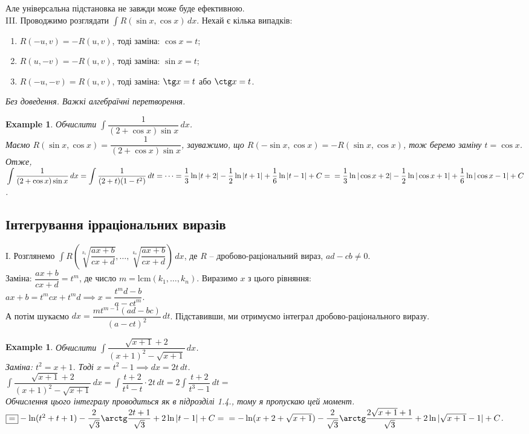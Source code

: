 \documentclass[a4paper, 10pt]{article}
\def\huge{\displaystyle}
\theoremstyle{theoremdd}
\theoremstyle{theoremdd}
\theoremstyle{theoremdd}
\theoremstyle{theoremdd}
\theoremstyle{theoremdd}
\newtheorem{example}[theorem]{Example}
\theoremstyle{theoremdd}
\theoremstyle{theoremdd}
\theoremstyle{theoremdd}
\theoremstyle{theoremdd}
\begin{document}
Але універсальна підстановка не завжди може буде ефективною.
\bigskip \\
III. Проводжимо розглядати $\huge\int R(\sin x, \cos x) \,dx$. Нехай є кілька випадків:
\begin{enumerate}[nosep,wide=0pt,label={\arabic*)}]
\item $R(-u,v) = -R(u,v)$, тоді заміна: $\cos x = t$;
\item $R(u,-v) = -R(u,v)$, тоді заміна: $\sin x = t$;
\item $R(-u,-v) = R(u,v)$, тоді заміна: $\tg x = t$ або $\ctg x = t$.
\end{enumerate}
\textit{Без доведення. Важкі алгебраїчні перетворення.}

\begin{example}
Обчислити $\huge\int \dfrac{1}{(2+\cos x) \sin x}\,dx$.\\
Маємо $R(\sin x,\cos x) = \dfrac{1}{(2+\cos x)\sin x}$, зауважимо, що $R(-\sin x, \cos x) = -R(\sin x, \cos x)$, тож беремо заміну $t = \cos x$. Отже,\\
$\huge\int \dfrac{1}{(2+\cos x) \sin x}\,dx = \int \dfrac{1}{(2+t)(1-t^2)}\,dt = \dots = \dfrac{1}{3} \ln |t+2| - \dfrac{1}{2} \ln |t+1| + \dfrac{1}{6} \ln |t-1| + C = \\ = \dfrac{1}{3} \ln |\cos x + 2| - \dfrac{1}{2} \ln |\cos x +1| + \dfrac{1}{6} \ln | \cos x - 1| + C$.
\end{example}
\subsection{Інтегрування ірраціональних виразів}

I. Розглянемо $\huge \int R\left( \sqrt[k_1]{\dfrac{ax+b}{cx+d}}, \dots, \sqrt[k_n]{\dfrac{ax+b}{cx+d}} \right)\,dx$, де $R$ -- дробово-раціональний вираз, $ad-cb \neq 0$.\\
Заміна: $\dfrac{ax+b}{cx+d} = t^m$, де число $m = \text{lcm}(k_1,\dots,k_n)$. Виразимо $x$ з цього рівняння:\\
$ax+b =t^m cx + t^m d \implies x = \dfrac{t^md-b}{a-ct^m}$.\\
А потім шукаємо $dx = \dfrac{mt^{m-1}(ad-bc)}{(a-ct)^2}\,dt$. Підставивши, ми отримуємо інтеграл дробово-раціонального виразу.

\begin{example}
Обчислити $\huge \int \dfrac{\sqrt{x+1}+2}{(x+1)^2 - \sqrt{x+1}}\,dx$.\\
Заміна: $t^2 = x+1$. Тоді $x = t^2 -1 \implies dx = 2t \,dt$.\\
$\huge \int \dfrac{\sqrt{x+1}+2}{(x+1)^2 - \sqrt{x+1}}\,dx = \int \dfrac{t+2}{t^4-t} \cdot 2t\,dt = 2 \int \dfrac{t+2}{t^3-1}\,dt \boxed{=}$\\
Обчислення цього інтегралу проводиться як в підрозділі 1.4., тому я пропускаю цей момент.\\
$\boxed{=} -\ln(t^2+t+1) - \dfrac{2}{\sqrt{3}} \arctg \dfrac{2t+1}{\sqrt{3}} + 2 \ln|t-1|+ C = \\
= -\ln(x+2+\sqrt{x+1}) - \dfrac{2}{\sqrt{3}} \arctg \dfrac{2\sqrt{x+1}+1}{\sqrt{3}} + 2 \ln|\sqrt{x+1}-1| + C$.
\end{example}
\end{document}
